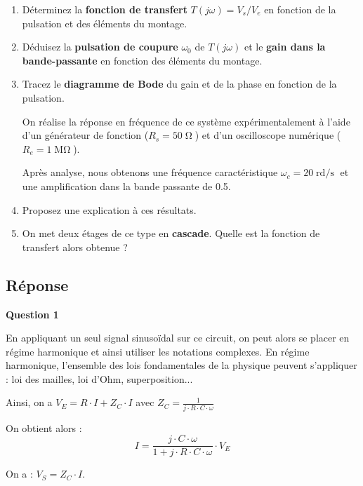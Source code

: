 \begin{enumerate}
	\item Déterminez la \textbf{fonction de transfert} $T( j\omega ) = V_s / V_e$ en fonction de la pulsation et des éléments du montage.
		
	\item Déduisez la \textbf{pulsation de coupure} $\omega_0$ de $T( j\omega )$ et le \textbf{gain dans la bande-passante} en fonction des éléments du montage.

	\item Tracez le \textbf{diagramme de Bode} du gain et de la phase en fonction de la pulsation.

	\medskip
	
	On réalise la réponse en fréquence de ce système expérimentalement à l'aide d'un générateur de fonction ($R_s = 50\operatorname{\Omega}$) et d'un oscilloscope numérique ($R_e = 1\operatorname{M\Omega}$).
	
	Après analyse, nous obtenons une fréquence caractéristique $\omega_c = 20\operatorname{rd/s}$ et une amplification dans la bande passante de 0.5.
	
	\item Proposez une explication à ces résultats.
	
	\medskip
	
	\item On met deux étages de ce type en \textbf{cascade}. Quelle est la fonction de transfert alors obtenue ?

\end{enumerate}


\subsection*{Réponse}

\textbf{Question 1}

En appliquant un seul signal sinusoïdal sur ce circuit, on peut alors se placer en régime harmonique et ainsi utiliser les notations complexes. En régime harmonique, l'ensemble des lois fondamentales de la physique peuvent s'appliquer : loi des mailles, loi d'Ohm, superposition...

Ainsi, on a $V_E = R \cdot I + Z_C \cdot I$ avec $Z_C = \frac{1}{j \cdot R \cdot C \cdot \omega}$

On obtient alors : $$I = \frac{j \cdot C \cdot \omega}{1 + j \cdot R \cdot C \cdot \omega} \cdot V_E$$

On a : $V_S = Z_C \cdot I$.

